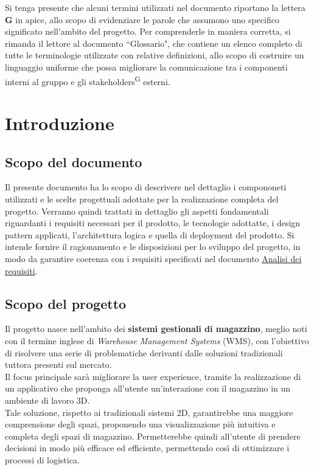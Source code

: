 \begin{beginningnote}
    Si tenga presente che alcuni termini utilizzati nel documento riportano la lettera \textbf{G} in apice, allo scopo di evidenziare le parole che assumono uno specifico significato nell'ambito del progetto. 
    Per comprenderle in maniera corretta, si rimanda il lettore al documento ``Glossario", che contiene un elenco completo di tutte le terminologie utilizzate con relative definizioni, 
    allo scopo di costruire un linguaggio uniforme che possa migliorare la comunicazione tra i componenti interni al gruppo e gli stakeholders\textsuperscript{G} esterni.   
\end{beginningnote}

\section{Introduzione}\label{sec:introduzione}
\subsection{Scopo del documento}\label{sec:introduzione:scopo_del_documento}
    Il presente documento ha lo scopo di descrivere nel dettaglio i compononeti utilizzati e le scelte progettuali adottate per la realizzazione completa del progetto.
    Verranno quindi trattati in dettaglio gli aspetti fondamentali riguardanti i requisiti necessari per il prodotto, le tecnologie adottatte, i design pattern applicati, l'architettura logica e quella di deployment del prodotto.
    Si intende fornire il ragionamento e le disposizioni per lo sviluppo del progetto, in modo da garantire coerenza con i requisiti specificati nel documento \hyperref[sec:ref_esterni]{Analisi dei requisiti}. 

\subsection{Scopo del progetto}\label{sec:introduzione:scopo_del_progetto}
    Il progetto nasce nell'ambito dei \textbf{sistemi gestionali di magazzino}, meglio noti con il termine inglese di \textit{Warehouse Management Systems} (WMS), con 
    l'obiettivo di risolvere una serie di problematiche derivanti dalle soluzioni tradizionali tuttora presenti sul mercato.\\
    Il focus principale sarà migliorare la user experience, tramite la realizzazione di un applicativo che proponga all'utente un'interazione con il magazzino in un 
    ambiente di lavoro 3D. \\
    Tale soluzione, rispetto ai tradizionali sistemi 2D, garantirebbe una maggiore comprensione degli spazi, proponendo una visualizzazione più intuitiva e completa 
    degli spazi di magazzino. Permetterebbe quindi all'utente di prendere decisioni in modo più efficace ed efficiente, permettendo così di ottimizzare i processi di logistica.
    
